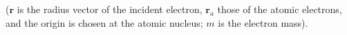 ($\mathbf r$ is the radius vector of the incident electron, $\mathbf r_a$ those of the atomic electrons, and the origin is chosen at the atomic nucleus; $m$ is the electron mass).
